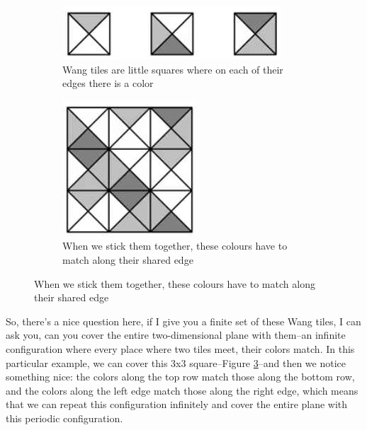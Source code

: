 \documentclass[]{article}
\begin{document}
\begin{figure}[H]
	\caption{Wang Tiles}
	\begin{subfigure}[t]{0.45\textwidth}
		\caption{Wang tiles are little squares where on each of their edges there is a color}\label{fig:wang1}
		\includegraphics[width=\textwidth]{wang1}
	\end{subfigure}
	\begin{subfigure}[t]{0.45\textwidth}
		\caption{When we stick them together, these colours have to match along their shared edge}\label{fig:wang2}
		\includegraphics[width=\textwidth]{wang2}
	\end{subfigure}
\end{figure}
So, there's a nice question here, if I give you a finite set of these Wang tiles, I can ask you, can you cover the entire two-dimensional plane with them--an infinite configuration where every place where two tiles meet, their colors match.
In this particular example, we can cover this 3x3 square--Figure \ref{fig:wang2}--and then we notice something nice: the colors along the top row match those along the bottom row, and the colors along the left edge match those along the right edge, which means that we can repeat this configuration infinitely and cover the entire plane with this periodic configuration.
\end{document}
